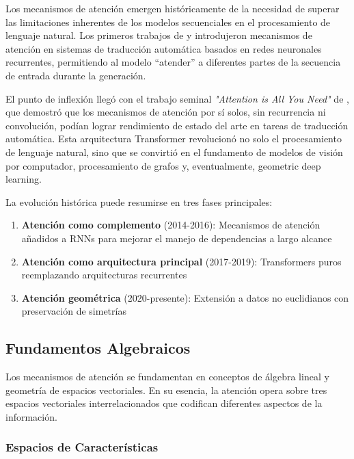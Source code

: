 Los mecanismos de atención emergen históricamente de la necesidad de superar las limitaciones inherentes de los modelos secuenciales en el procesamiento de lenguaje natural. Los primeros trabajos de \citet{bahdanau2014neural} y \citet{luong2015effective} introdujeron mecanismos de atención en sistemas de traducción automática basados en redes neuronales recurrentes, permitiendo al modelo ``atender'' a diferentes partes de la secuencia de entrada durante la generación.

El punto de inflexión llegó con el trabajo seminal \textit{"Attention is All You Need"} de \citet{vaswani2017attentionneed}, que demostró que los mecanismos de atención por sí solos, sin recurrencia ni convolución, podían lograr rendimiento de estado del arte en tareas de traducción automática. Esta arquitectura \gls{Transformer} revolucionó no solo el procesamiento de lenguaje natural, sino que se convirtió en el fundamento de modelos de visión por computador, procesamiento de grafos y, eventualmente, geometric deep learning.

La evolución histórica puede resumirse en tres fases principales:

\begin{enumerate}
    \item \textbf{Atención como complemento} (2014-2016): Mecanismos de atención añadidos a \glspl{RNN} para mejorar el manejo de dependencias a largo alcance
    \item \textbf{Atención como arquitectura principal} (2017-2019): \glspl{Transformer} puros reemplazando arquitecturas recurrentes
    \item \textbf{Atención geométrica} (2020-presente): Extensión a datos no euclidianos con preservación de simetrías
\end{enumerate}

\subsection{Fundamentos Algebraicos}\label{subsec:fundamentos_algebraicos_atencion}

Los mecanismos de atención se fundamentan en conceptos de álgebra lineal y geometría de espacios vectoriales. En su esencia, la atención opera sobre tres espacios vectoriales interrelacionados que codifican diferentes aspectos de la información.

\subsubsection{Espacios de Características}\label{subsubsec:espacios_caracteristicas}

